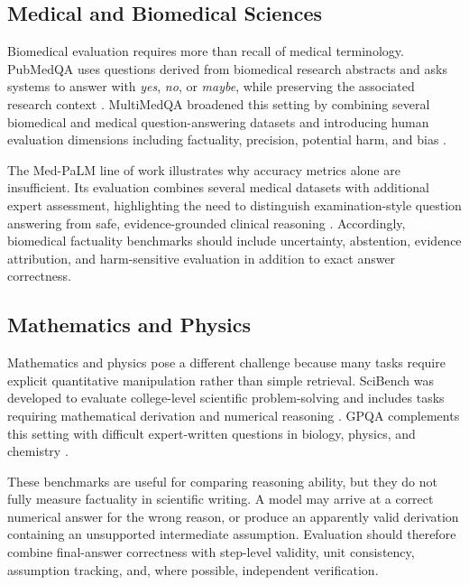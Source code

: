\documentclass[10pt,a4paper]{article}
\begin{document}
\FloatBarrier

\subsection{Medical and Biomedical Sciences}

Biomedical evaluation requires more than recall of medical terminology. PubMedQA uses questions derived from biomedical research abstracts and asks systems to answer with \textit{yes}, \textit{no}, or \textit{maybe}, while preserving the associated research context \cite{jin2019pubmedqa}. MultiMedQA broadened this setting by combining several biomedical and medical question-answering datasets and introducing human evaluation dimensions including factuality, precision, potential harm, and bias \cite{singhal2023large}.

The Med-PaLM line of work illustrates why accuracy metrics alone are insufficient. Its evaluation combines several medical datasets with additional expert assessment, highlighting the need to distinguish examination-style question answering from safe, evidence-grounded clinical reasoning \cite{singhal2023large}. Accordingly, biomedical factuality benchmarks should include uncertainty, abstention, evidence attribution, and harm-sensitive evaluation in addition to exact answer correctness.

\subsection{Mathematics and Physics}

Mathematics and physics pose a different challenge because many tasks require explicit quantitative manipulation rather than simple retrieval. SciBench was developed to evaluate college-level scientific problem-solving and includes tasks requiring mathematical derivation and numerical reasoning \cite{wang2023scibench}. GPQA complements this setting with difficult expert-written questions in biology, physics, and chemistry \cite{rein2023gpqa}.

These benchmarks are useful for comparing reasoning ability, but they do not fully measure factuality in scientific writing. A model may arrive at a correct numerical answer for the wrong reason, or produce an apparently valid derivation containing an unsupported intermediate assumption. Evaluation should therefore combine final-answer correctness with step-level validity, unit consistency, assumption tracking, and, where possible, independent verification.
\end{document}
